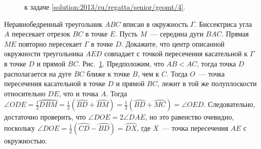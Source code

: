 \ifsolution
\begin{figure}\centering
    \caption{к задаче \ref{solution:2013/ru/regatta/senior/geomt/4}.}
    \label{fig:solution:2013/ru/regatta/senior/geomt/4}
\end{figure}
\fi %


\problem
Неравнобедренный треугольник $ABC$ вписан в окружность $\Gamma$.
Биссектриса угла $A$ пересекает отрезок $BC$ в точке $E$.
Пусть $M$~--- середина дуги $BAC$.
Прямая $ME$ повторно пересекает $\Gamma$ в точке $D$.
Докажите, что центр описанной окружности треугольника $AED$ совпадает с точкой
пересечения касательной к $\Gamma$ в точке $D$ и прямой $BC$.
\solution
\label{solution:2013/ru/regatta/senior/geomt/4}%
Рис.~\ref{fig:solution:2013/ru/regatta/senior/geomt/4}.
Предположим, что $AB < AC$, тогда точка $D$ располагается на дуге $BC$ ближе к
точке $B$, чем к $C$.
Тогда $O$~--- точка пересечения касательной в точке $D$ и прямой $BC$, лежит в
той же полуплоскости относительно $DE$, что и точка $A$.
Тогда
\(
    \angle ODE
=
    \frac{1}{2} \wideparen{DBM}
=
    \frac{1}{2}(\wideparen{BD} + \wideparen{BM})
=
    \frac{1}{2} (\wideparen{BD} + \wideparen{MC})
=
    \angle OED
\).
Следовательно, достаточно проверить, что $\angle DOE = 2\angle DAE$, но это
равенство очевидно, поскольку
$\angle DOE = \frac{1}{2} (\wideparen{CD}-\wideparen{BD}) = \wideparen{DX}$,
где $X$~--- точка пересечения $AE$ с окружностью.
\endproblem
